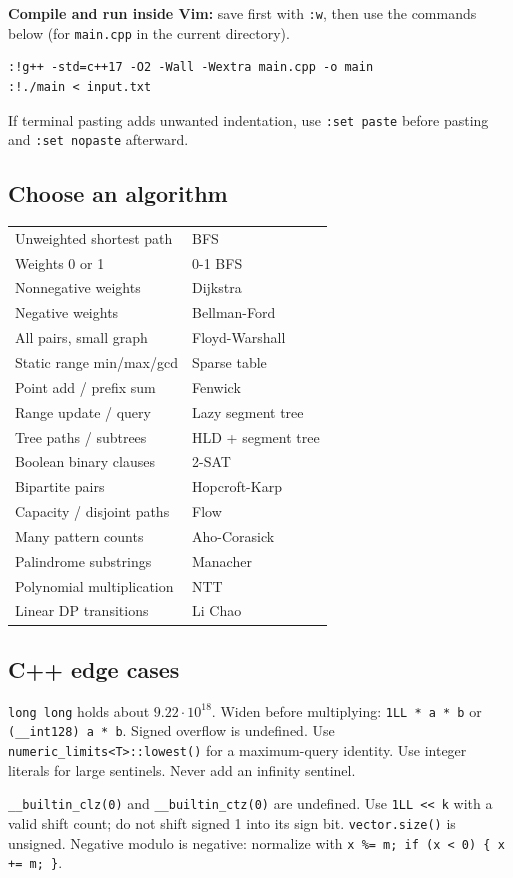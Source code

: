 \textbf{Compile and run inside Vim:} save first with \texttt{:w}, then use
the commands below (for \texttt{main.cpp} in the current directory).
\begin{lstlisting}[language={}]
:!g++ -std=c++17 -O2 -Wall -Wextra main.cpp -o main
:!./main < input.txt
\end{lstlisting}
If terminal pasting adds unwanted indentation, use \texttt{:set paste}
before pasting and \texttt{:set nopaste} afterward.

\subsection{Choose an algorithm}
\begin{tabular}{@{}ll@{}}
Unweighted shortest path & BFS \\
Weights 0 or 1 & 0-1 BFS \\
Nonnegative weights & Dijkstra \\
Negative weights & Bellman-Ford \\
All pairs, small graph & Floyd-Warshall \\
Static range min/max/gcd & Sparse table \\
Point add / prefix sum & Fenwick \\
Range update / query & Lazy segment tree \\
Tree paths / subtrees & HLD + segment tree \\
Boolean binary clauses & 2-SAT \\
Bipartite pairs & Hopcroft-Karp \\
Capacity / disjoint paths & Flow \\
Many pattern counts & Aho-Corasick \\
Palindrome substrings & Manacher \\
Polynomial multiplication & NTT \\
Linear DP transitions & Li Chao
\end{tabular}

\subsection{C++ edge cases}
\texttt{long long} holds about $9.22\cdot10^{18}$. Widen before multiplying:
\texttt{1LL * a * b} or \texttt{(\_\_int128) a * b}. Signed overflow is undefined.
Use \texttt{numeric\_limits<T>::lowest()} for a maximum-query identity.
Use integer literals for large sentinels. Never add an infinity sentinel.

\texttt{\_\_builtin\_clz(0)} and \texttt{\_\_builtin\_ctz(0)} are undefined.
Use \texttt{1LL << k} with a valid shift count; do not shift signed 1 into its
sign bit. \texttt{vector.size()} is unsigned. Negative modulo is negative:
normalize with \texttt{x \%= m; if (x < 0) \{ x += m; \}}.

